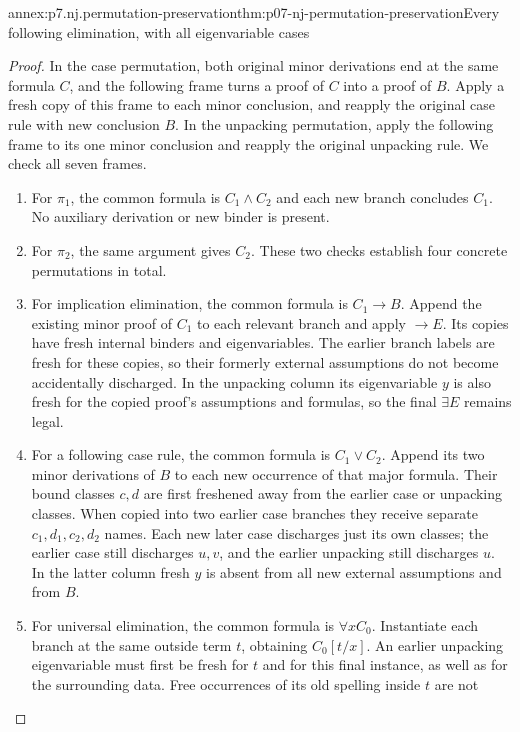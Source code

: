 \begin{annexitem}{annex:p7.nj.permutation-preservation}{thm:p07-nj-permutation-preservation}{Every following elimination, with all eigenvariable cases}
\begin{proof}
In the case permutation, both original minor derivations end at
the same formula \(C\), and the following frame turns a proof
of \(C\) into a proof of \(B\). Apply a fresh copy of this
frame to each minor conclusion, and reapply the original case
rule with new conclusion \(B\). In the unpacking permutation,
apply the following frame to its one minor conclusion and
reapply the original unpacking rule. We check all seven frames.
\begin{enumerate}
\item For \(\pi_1\), the common formula is \(C_1\land C_2\)
and each new branch concludes \(C_1\). No auxiliary derivation
or new binder is present.
\item For \(\pi_2\), the same argument gives \(C_2\).
These two checks establish four concrete permutations in total.
\item For implication elimination, the common formula is
\(C_1\to B\). Append the existing minor proof of \(C_1\)
to each relevant branch and apply \(\to E\). Its copies
have fresh internal binders and eigenvariables. The earlier
branch labels are fresh for these copies, so their formerly
external assumptions do not become accidentally discharged.
In the unpacking column its eigenvariable \(y\) is also fresh
for the copied proof's assumptions and formulas, so the final
\(\exists E\) remains legal.
\item For a following case rule, the common formula is
\(C_1\lor C_2\). Append its two minor derivations of \(B\)
to each new occurrence of that major formula. Their bound
classes \(c,d\) are first freshened away from the earlier
case or unpacking classes. When copied into two earlier case
branches they receive separate \(c_1,d_1,c_2,d_2\) names.
Each new later case discharges just its own classes; the earlier
case still discharges \(u,v\), and the earlier unpacking
still discharges \(u\). In the latter column fresh \(y\)
is absent from all new external assumptions and from \(B\).
\item For universal elimination, the common formula is
\(\forall x C_0\). Instantiate each branch at the same
outside term \(t\), obtaining \(C_0[t/x]\). An earlier
unpacking eigenvariable must first be fresh for \(t\) and
for this final instance, as well as for the surrounding data.
Free occurrences of its old spelling inside \(t\) are not

\end{enumerate}
\end{proof}
\end{annexitem}
